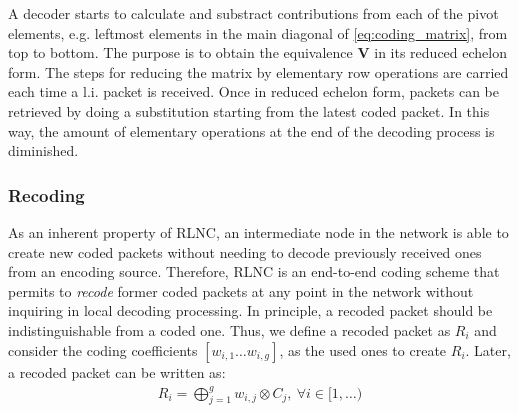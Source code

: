 A decoder starts to calculate and substract contributions from each
of the pivot elements, e.g. leftmost elements in the main diagonal of
\eqref{eq:coding_matrix}, from top to bottom. The purpose is to obtain
the equivalence  $\textbf{V}$ in its reduced echelon form. The steps
for reducing the matrix by elementary row operations are carried each time
a \ac{l.i.} packet is received. Once in reduced echelon form, packets
can be retrieved by doing a substitution starting from the latest
coded packet. In this way, the amount of elementary operations at the end
of the decoding process is diminished.

\subsubsection{Recoding}
As an inherent property of \ac{RLNC}, an intermediate node in the network
is able to create new coded packets without needing to decode previously
received ones from an encoding source. Therefore, \ac{RLNC} is an end-to-end
coding scheme that permits to \textit{recode} former coded packets at any
point in the network without inquiring in local decoding processing. In
principle, a recoded packet should be indistinguishable from a coded one.
Thus, we define a recoded packet as $R_i$ and consider the coding
coefficients $ \left[w_{i,1} \ldots w_{i,g} \right]$, as the used ones to
create $R_i$. Later, a recoded packet can be written as:
%
\begin{align}
\label{eq:recoded_packet}
R_i = \bigoplus_{j=1}^{g} w_{i,j} \otimes C_j  ,\ \forall i \in [1,\ldots)
\end{align}

